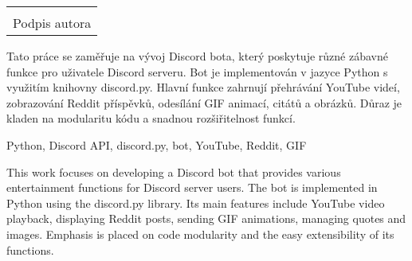 \documentclass[12pt, a4paper]{report}
\newcommand\datumOdevzdani{31. 12. 2024} %
\begin{document}
	\vspace*{0.7\textheight} %

	\vfill
	\noindent{V Opavě \datumOdevzdani\\}
	\noindent
	\begin{minipage}{\linewidth}
		\hspace{9.5cm} 
		\begin{tabular}{@{}p{6cm}@{}}
			\dotfill \\
			Podpis autora
		\end{tabular}
	\end{minipage}
	
	\clearpage

	\tableofcontents
	\clearpage

	Tato práce se zaměřuje na vývoj Discord bota, který poskytuje různé zábavné funkce pro uživatele Discord serveru. Bot je implementován v jazyce Python s využitím knihovny discord.py. Hlavní funkce zahrnují přehrávání YouTube videí, zobrazování Reddit příspěvků, odesílání GIF animací, citátů a obrázků. Důraz je kladen na modularitu kódu a snadnou rozšiřitelnost funkcí.

	\vspace{18pt}

	\noindent Python, Discord API, discord.py, bot, YouTube, Reddit, GIF

	\vspace{18pt}
	This work focuses on developing a Discord bot that provides various entertainment functions for Discord server users. The bot is implemented in Python using the discord.py library. Its main features include YouTube video playback, displaying Reddit posts, sending GIF animations, managing quotes and images. Emphasis is placed on code modularity and the easy extensibility of its functions.
\end{document}
